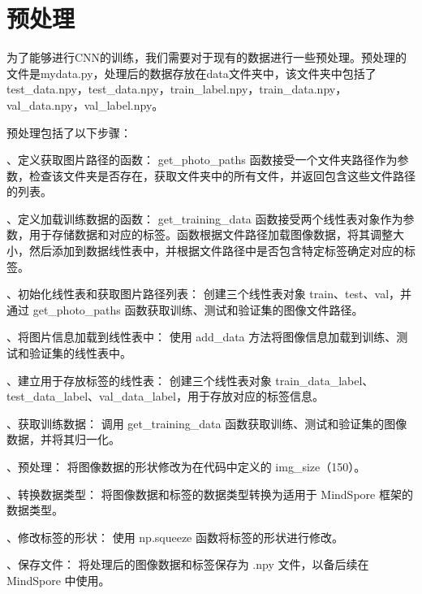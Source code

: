 \section{预处理}
为了能够进行CNN的训练，我们需要对于现有的数据进行一些预处理。预处理的文件是mydata.py，处理后的数据存放在data文件夹中，该文件夹中包括了test\_data.npy，test\_data.npy，train\_label.npy，train\_data.npy，val\_data.npy，val\_label.npy。

预处理包括了以下步骤：

、定义获取图片路径的函数： get\_photo\_paths 函数接受一个文件夹路径作为参数，检查该文件夹是否存在，获取文件夹中的所有文件，并返回包含这些文件路径的列表。

、定义加载训练数据的函数： get\_training\_data 函数接受两个线性表对象作为参数，用于存储数据和对应的标签。函数根据文件路径加载图像数据，将其调整大小，然后添加到数据线性表中，并根据文件路径中是否包含特定标签确定对应的标签。

、初始化线性表和获取图片路径列表： 创建三个线性表对象 train、test、val，并通过 get\_photo\_paths 函数获取训练、测试和验证集的图像文件路径。

、将图片信息加载到线性表中： 使用 add\_data 方法将图像信息加载到训练、测试和验证集的线性表中。

、建立用于存放标签的线性表： 创建三个线性表对象 train\_data\_label、test\_data\_label、val\_data\_label，用于存放对应的标签信息。

、获取训练数据： 调用 get\_training\_data 函数获取训练、测试和验证集的图像数据，并将其归一化。

、预处理： 将图像数据的形状修改为在代码中定义的 img\_size（150）。

、转换数据类型： 将图像数据和标签的数据类型转换为适用于 MindSpore 框架的数据类型。

、修改标签的形状： 使用 np.squeeze 函数将标签的形状进行修改。

、保存文件： 将处理后的图像数据和标签保存为 .npy 文件，以备后续在 MindSpore 中使用。